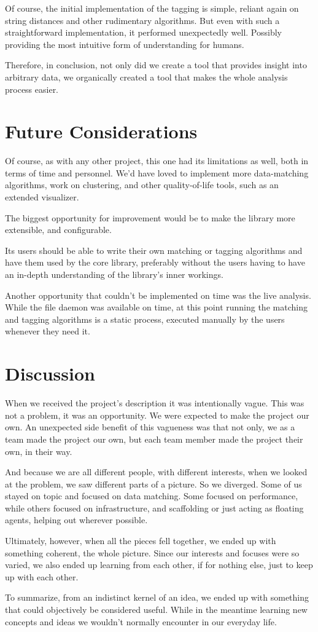 Of course, the initial implementation of the tagging is simple, reliant again on
string distances and other rudimentary algorithms.
But even with such a straightforward implementation, it performed unexpectedly well.
Possibly providing the most intuitive form of understanding for humans.

Therefore, in conclusion, not only did we create a tool that provides insight into arbitrary data,
we organically created a tool that makes the whole analysis process easier.


\section{Future Considerations}
Of course, as with any other project, this one had its limitations as well, both
in terms of time and personnel.
We'd have loved to implement more data-matching algorithms,
work on clustering, and other quality-of-life tools, such as an extended visualizer.

The biggest opportunity for improvement would be to make the library more extensible,
and configurable.

Its users should be able to write their own matching or tagging algorithms and have
them used by the core library, preferably without the users having to have an in-depth
understanding of the library's inner workings.

Another opportunity that couldn't be implemented on time was the live analysis.
While the file daemon was available on time, at this point running the matching
and tagging algorithms is a static process, executed manually by the users
whenever they need it.


\section{Discussion}

When we received the project's description it was intentionally vague.
This was not a problem, it was an opportunity.
We were expected to make the project our own.
An unexpected side benefit of this vagueness was that not only, we as a team
made the project our own, but each team member made the project their own, in their way.

And because we are all different people, with different interests, when we looked at the problem, we saw different parts of a picture.
So we diverged.
Some of us stayed on topic and focused on data matching.
Some focused on performance, while others focused on infrastructure, and scaffolding or
just acting as floating agents, helping out wherever possible.

Ultimately, however, when all the pieces fell together, we ended up with something coherent, the whole picture.
Since our interests and focuses were so varied, we also ended up learning from each other,
if for nothing else, just to keep up with each other.

To summarize, from an indistinct kernel of an idea, we ended up with something
that could objectively be considered useful.
While in the meantime learning new concepts and ideas we wouldn't normally encounter in our
everyday life.

